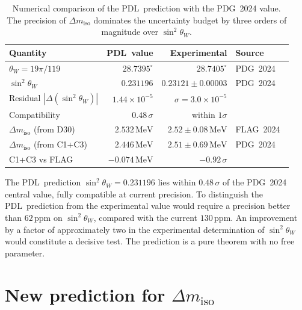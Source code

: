 \documentclass[12pt,a4paper]{article}
\theoremstyle{plain}
\theoremstyle{definition}
\theoremstyle{remark}
\newcommand{\PDL}{\textsc{PDL}}
\newcommand{\thetaW}{\theta_W}
\newcommand{\sinW}{\sin^2\!\thetaW}
\newcommand{\Dmiso}{\Delta m_{\mathrm{iso}}}
\begin{document}
\begin{table}[H]
\centering
\caption{Numerical comparison of the \PDL\ prediction with the PDG~2024 value. The precision of $\Dmiso$ dominates the uncertainty budget by three orders of magnitude over $\sinW$.}
\label{tab:numerical}
\bigskip
\begin{tabular}{lrrl}
\toprule
Quantity & \PDL\ value & Experimental & Source \\
\midrule
$\thetaW = 19\pi/119$ & $28.7395^{\circ}$ & $28.7405^{\circ}$ & PDG~2024~\cite{PDG2024} \\
$\sinW$ & $0.231196$ & $0.23121 \pm 0.00003$ & PDG~2024~\cite{PDG2024} \\
Residual $|\Delta(\sinW)|$ & $1.44\times10^{-5}$ & $\sigma = 3.0\times10^{-5}$ & \\
Compatibility & $0.48\,\sigma$ & within $1\sigma$ & \\
\midrule
$\Dmiso$ (from D30) & $2.532\,\mathrm{MeV}$ & $2.52 \pm 0.08\,\mathrm{MeV}$ & FLAG~2024~\cite{FLAG2024} \\
$\Dmiso$ (from C1+C3) & $2.446\,\mathrm{MeV}$ & $2.51 \pm 0.69\,\mathrm{MeV}$ & PDG~2024~\cite{PDG2024} \\
C1+C3 vs FLAG & $-0.074\,\mathrm{MeV}$ & $-0.92\,\sigma$ & \\
\bottomrule
\end{tabular}
\end{table}

The \PDL\ prediction $\sinW = 0.231196$ lies within $0.48\,\sigma$ of the PDG~2024 central value, fully compatible at current precision. To distinguish the \PDL\ prediction from the experimental value would require a precision better than $62\,\mathrm{ppm}$ on $\sinW$, compared with the current $130\,\mathrm{ppm}$. An improvement by a factor of approximately two in the experimental determination of $\sinW$ would constitute a decisive test. The prediction is a pure theorem with no free parameter.

\section{New prediction for \texorpdfstring{$\Delta m_{\mathrm{iso}}$}{Delta m_iso}}
\label{sec:dmiso}
\end{document}
